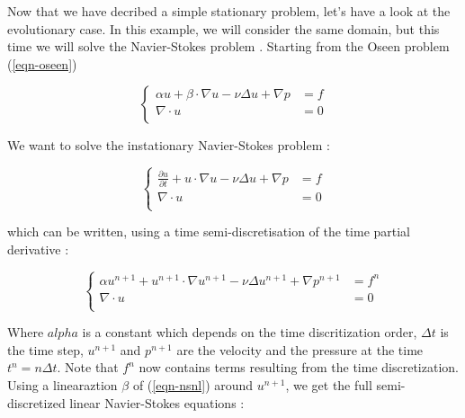 %
%
%
%
%


Now that we have decribed a simple stationary problem, let's have a look at the evolutionary
case. In this example, we will consider the same domain, but this time we will solve the
Navier-Stokes problem . Starting from the Oseen problem (\ref{eqn-oseen})

\begin{equation*}
\left\{
\begin{array}{lc}
\displaystyle \alpha u + \beta \cdot \nabla u - \nu \Delta u+
\nabla p & = f \\
\displaystyle \nabla \cdot u & = 0  \\
\end{array}
\right.
\end{equation*}

We want to solve the instationary Navier-Stokes problem :

\begin{equation*} \label{eqn-navierstokes}
\left\{
\begin{array}{lc}
\displaystyle \frac{\partial u}{\partial t} + u \cdot \nabla u - \nu \Delta u+
\nabla p & = f \\
\displaystyle \nabla \cdot u & = 0  \\
\end{array}
\right.
\end{equation*}

which can be written, using a time semi-discretisation of the time partial derivative :

\begin{equation*} \label{eqn-nsnl}
\left\{
\begin{array}{lc}
\displaystyle \alpha u^{n+1} + u^{n+1} \cdot \nabla u^{n+1} - \nu \Delta u^{n+1}+
\nabla p^{n+1} & = f^n  \\
\displaystyle \nabla \cdot u & = 0  \\
\end{array}
\right.
\end{equation*}

Where $alpha$ is a constant which depends on the time discritization order, $\Delta t$ is the time step, $u^{n+1}$ and $p^{n+1}$ are the velocity and the pressure at the time $t^n = n\Delta t$.
Note that $f^n$ now contains terms resulting from the time discretization.
Using a linearaztion $\beta$ of (\ref{eqn-nsnl}) around $u^{n+1}$, we get the full semi-discretized linear Navier-Stokes
equations :

